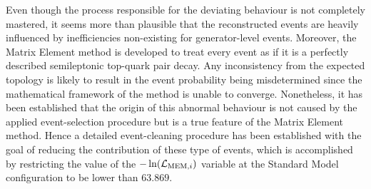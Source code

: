 %

Even though the process responsible for the deviating behaviour is not completely mastered, it seems more than plausible that the reconstructed events are heavily influenced by inefficiencies non-existing for generator-level events. Moreover, the Matrix Element method is developed to treat every event as if it is a perfectly described semileptonic top-quark pair decay. Any inconsistency from the expected topology is likely to result in the event probability being misdetermined since the mathematical framework of the method is unable to converge.
Nonetheless, it has been established that the origin of this abnormal behaviour is not caused by the applied event-selection procedure but is a true feature of the Matrix Element method.
Hence a detailed event-cleaning procedure has been established with the goal of reducing the contribution of these type of events, which is accomplished by restricting the value of the $-\ln(\mathcal{L}_{\textrm{MEM}, i})$ variable at the Standard Model configuration to be lower than $63.869$. 

